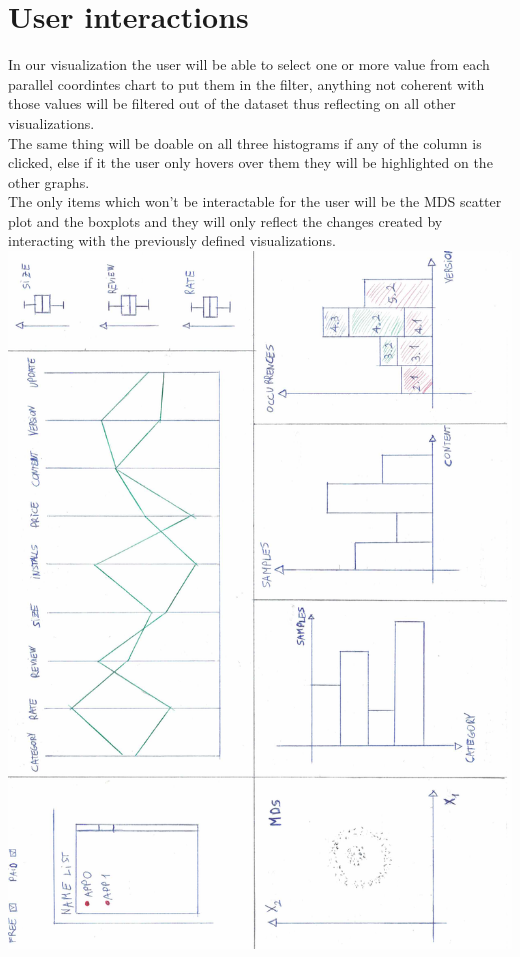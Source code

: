 \documentclass[a4paper, 11pt]{article}
\begin{document}
\section{User interactions}
In our visualization the user will be able to select one or more value from each parallel coordintes chart to put them in the filter, anything not coherent with those values will be filtered out of the dataset thus reflecting on all other visualizations.\\
The same thing will be doable on all three histograms if any of the column is clicked, else if it the user only hovers over them they will be highlighted on the other graphs.\\
The only items which won't be interactable for the user will be the MDS scatter plot and the boxplots and they will only reflect the changes created by interacting with the previously defined visualizations. \\
\includegraphics[width=\textwidth, angle=180]{mockup.png}
\end{document}
